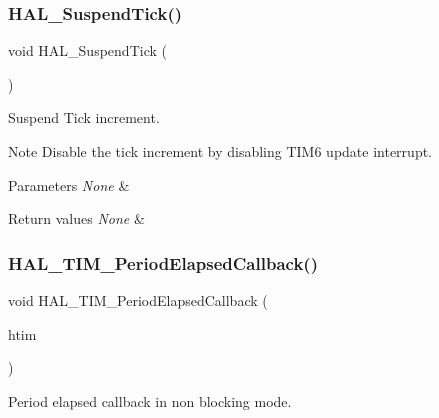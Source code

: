 \subsubsection{\texorpdfstring{H\+A\+L\+\_\+\+Suspend\+Tick()}{HAL\_SuspendTick()}}
{\footnotesize\ttfamily void H\+A\+L\+\_\+\+Suspend\+Tick (\begin{DoxyParamCaption}\item[{void}]{ }\end{DoxyParamCaption})}



Suspend Tick increment. 

\begin{DoxyNote}{Note}
Disable the tick increment by disabling T\+I\+M6 update interrupt. 
\end{DoxyNote}

\begin{DoxyParams}{Parameters}
{\em None} & \\
\hline
\end{DoxyParams}

\begin{DoxyRetVals}{Return values}
{\em None} & \\
\hline
\end{DoxyRetVals}
\mbox{\label{group___h_a_l___time_base___t_i_m_ga8a3b0ad512a6e6c6157440b68d395eac}} 
\subsubsection{\texorpdfstring{H\+A\+L\+\_\+\+T\+I\+M\+\_\+\+Period\+Elapsed\+Callback()}{HAL\_TIM\_PeriodElapsedCallback()}}
{\footnotesize\ttfamily void H\+A\+L\+\_\+\+T\+I\+M\+\_\+\+Period\+Elapsed\+Callback (\begin{DoxyParamCaption}\item[{\hyperlink{struct_t_i_m___handle_type_def}{T\+I\+M\+\_\+\+Handle\+Type\+Def} $\ast$}]{htim }\end{DoxyParamCaption})}



Period elapsed callback in non blocking mode. 

